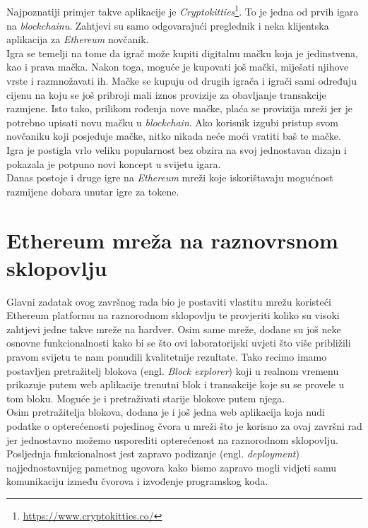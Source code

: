 \documentclass[times, utf8, zavrsni, numeric]{fer}
\begin{document}
\paragraph{}
Najpoznatiji primjer takve aplikacije je \emph{Cryptokitties}\footnote{\url{https://www.cryptokitties.co/}}. To je jedna od prvih igara na \emph{blockchainu}.
Zahtjevi su samo odgovarajući preglednik i neka klijentska aplikacija za \emph{Ethereum} novčanik. \\
Igra se temelji na tome da igrač može kupiti digitalnu mačku koja je jedinstvena, kao i prava mačka. Nakon toga, moguće je kupovati još mački, miješati njihove
vrste i razmnožavati ih. Mačke se kupuju od drugih igrača i igrači sami određuju cijenu na koju se još pribroji mali iznos provizije za obavljanje transakcije razmjene.
Isto tako, prilikom rođenja nove mačke, plaća se provizija mreži jer je potrebno upisati novu mačku u \emph{blockchain}. 
Ako korisnik izgubi pristup svom novčaniku koji posjeduje mačke, nitko nikada neće moći vratiti baš te mačke. \\
Igra je postigla vrlo veliku popularnost bez obzira na svoj jednostavan dizajn i pokazala je potpuno novi koncept u svijetu igara. \\
Danas postoje i druge igre na \emph{Ethereum} mreži koje iskorištavaju mogućnost razmijene dobara unutar igre za tokene.

\chapter{Ethereum mreža na raznovrsnom sklopovlju}
Glavni zadatak ovog završnog rada bio je postaviti vlastitu mrežu koristeći Ethereum platformu na raznorodnom sklopovlju
te provjeriti koliko su visoki zahtjevi jedne takve mreže na hardver. Osim same mreže, dodane su još neke osnovne funkcionalnosti
kako bi se što ovi laboratorijski uvjeti što više približili pravom svijetu te nam ponudili kvalitetnije rezultate. Tako recimo
imamo postavljen pretražitelj blokova (engl. \emph{Block explorer}) koji u realnom vremenu prikazuje putem web aplikacije
trenutni blok i transakcije koje su se provele u tom bloku. Moguće je i pretraživati starije blokove putem njega. \\
Osim pretražitelja blokova, dodana je i još jedna web aplikacija koja nudi podatke o opterećenosti pojedinog čvora u mreži
što je korisno za ovaj završni rad jer jednostavno možemo usporediti opterećenost na raznorodnom sklopovlju. \\
Posljednja funkcionalnost jest zapravo podizanje (engl. \emph{deployment}) najjednostavnijeg pametnog ugovora kako bismo
zapravo mogli vidjeti samu komunikaciju između čvorova i izvođenje programskog koda.
\end{document}
